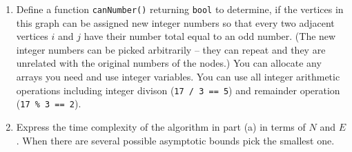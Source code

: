 \documentclass[a4paper,12pt]{article}
\begin{document}
\begin{enumerate}
\begin{enumerate}
\item 
Define a function {\tt canNumber()} returning {\tt bool} to determine, 
if the vertices in this graph can be assigned new integer numbers so that every two adjacent vertices $i$ and $j$ have their number total equal to an odd number.
(The new integer numbers can be picked arbitrarily -- they can repeat and
they are unrelated with the original numbers of the nodes.)
You can allocate any arrays you need and use integer variables. You can use all integer arithmetic operations including integer divison ({\tt 17 / 3 == 5}) 
and remainder operation ({\tt 17 \% 3 == 2}). 

\item Express the time complexity of the algorithm in part (a) 
in terms of $N$ and $E$. 
When there are several possible asymptotic bounds pick the smallest one. 
\end{enumerate}
\end{enumerate}
\end{document}
